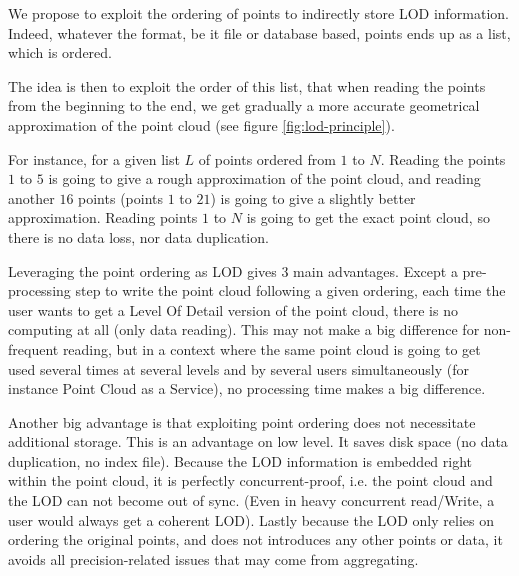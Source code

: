 			We propose to exploit the ordering of points to indirectly store LOD information.
			Indeed, whatever the format, be it file or database based, points ends up as a list, which is ordered.
			
			The idea is then to exploit the order of this list, 
			that when reading the points from the beginning to the end, we get gradually a more accurate geometrical approximation of the point cloud (see figure \ref{fig:lod-principle}). 
			 
			For instance, for a given list $L$ of points ordered from $1$ to $N$.
			Reading the points $1$ to $5$ is going to give a rough approximation of the point cloud, and reading another $16$ points (points $1$ to $21$) is going to give a slightly better approximation. Reading points $1$ to $N$ is going to get the exact point cloud, so there is no data loss, nor data duplication.
		 
			Leveraging the point ordering as LOD gives 3 main advantages.
				Except a pre-processing step to write the point cloud following a given ordering, each time the user wants to get a Level Of Detail version of the point cloud, there is no computing at all (only data reading).
				This may not make a big difference for non-frequent reading, but in a context where the same point cloud is going to get used several times at several levels and by several users simultaneously (for instance Point Cloud as a Service), no processing time makes a big difference.
			
				Another big advantage is that exploiting point ordering does not necessitate additional storage.
				This is an advantage on low level. It saves disk space (no data duplication, no index file). Because the LOD information is embedded right within the point cloud, it is perfectly concurrent-proof, i.e. the point cloud and the LOD can not become out of sync.
				(Even in heavy concurrent read/Write, a user would always get a coherent LOD).
				Lastly because the LOD only relies on ordering the original points, and does not introduces any other points or data, it avoids all precision-related issues that may come from aggregating.
			
